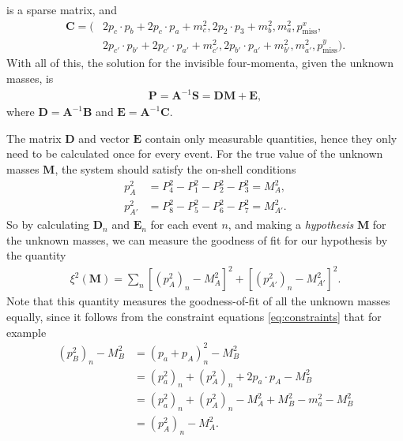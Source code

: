 \documentclass[twoside,english]{uiofysmaster}
\begin{document}
is a sparse matrix, and
\begin{align}
	\mathbf{C} = ( &2p_c \cdot p_b + 2p_c \cdot p_a + m_c^2, 2 p_2 \cdot p_3 + m_b^2, m_a^2, p_\mathrm{miss}^x, \nonumber \\ 
				   &2p_{c'}\cdot p_{b'} + 2 p_{c'} \cdot p_{a'} + m_{c'}^2, 2 p_{b'} \cdot p_{a'} + m_{b'}^2, m_{a'}^2, p_\mathrm{miss}^y ).
\end{align}
With all of this, the solution for the invisible four-momenta, given the unknown masses, is 
\begin{align}
	\mathbf{P} = \mathbf{A}^{-1} \mathbf{S} = \mathbf{D} \mathbf{M} + \mathbf{E},
\end{align}
where $\mathbf{D} = \mathbf{A}^{-1}\mathbf{B}$ and $\mathbf{E} = \mathbf{A}^{-1}\mathbf{C}$.

The matrix $\mathbf{D}$ and vector $\mathbf{E}$ contain only measurable quantities, hence they only need to be calculated once for every event. For the true value of the unknown masses $\mathbf{M}$, the system should satisfy the on-shell conditions
\begin{align}
	p_{A}^2 &= P_4^2 - P_1 ^2 - P_2^2 - P_3^2 = M_{A}^2, \nonumber\\
	p_{A'}^2 &= P_8^2 - P_5 ^2 - P_6^2 - P_7^2 = M_{A'}^2.
\end{align}
So by calculating $\mathbf{D}_n$ and $\mathbf{E}_n$ for each event $n$, and making a {\it hypothesis} $\mathbf{M}$ for the unknown masses, we can measure the goodness of fit for our hypothesis by the quantity
\begin{align}
	\xi^2(\mathbf{M}) = \sum_n \left[(p_{A}^2)_n - M_A^2\right]^2 + \left[(p_{A'}^2)_n - M_{A'}^2\right]^2. \label{eq:xisquared}
\end{align}
Note that this quantity measures the goodness-of-fit of all the unknown masses equally, since it follows from the constraint equations \eqref{eq:constraints} that for example
\begin{align}
	(p_B^2)_n - M_B^2 &= (p_a + p_A)_n^2 - M_B^2 \nonumber\\
				  &= (p_a^2)_n + (p_A^2)_n + 2p_a\cdot p_A - M_B^2\nonumber\\
				  &= (p_a^2)_n + (p_A^2)_n - M_A^2 + M_B^2 - m_a^2 - M_B^2\\
				  &= (p_A^2)_n - M_A^2.\nonumber
\end{align}
\end{document}
